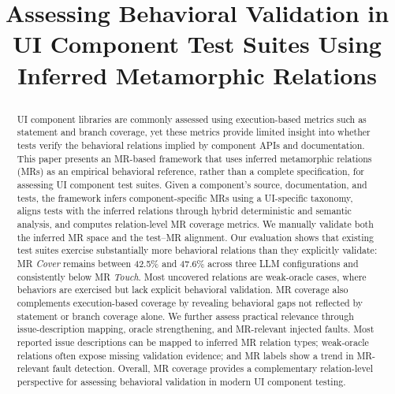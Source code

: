 \documentclass[10pt,conference]{IEEEtran}
\begin{document}
\title{

Assessing Behavioral Validation in UI Component Test Suites Using Inferred Metamorphic Relations
}
\author{
}

\author{


}


\maketitle
\IEEEpeerreviewmaketitle
\begin{abstract}

UI component libraries are commonly assessed using execution-based metrics such as statement and branch coverage, yet these metrics provide limited insight into whether tests verify the behavioral relations implied by component APIs and documentation. 
This paper presents an MR-based framework that uses inferred metamorphic relations (MRs) as an empirical behavioral reference, rather than a complete specification, for assessing UI component test suites. Given a component's source, documentation, and tests, the framework infers component-specific MRs using a UI-specific taxonomy, aligns tests with the inferred relations through hybrid deterministic and semantic analysis, and computes relation-level MR coverage metrics. We manually validate both the inferred MR space and the test--MR alignment.
Our evaluation shows that existing test suites exercise substantially more behavioral relations than they explicitly validate: MR \textit{Cover} remains between 42.5\% and 47.6\% across three LLM configurations and consistently below MR \textit{Touch}. Most uncovered relations are weak-oracle cases, where behaviors are exercised but lack explicit behavioral validation. MR coverage also complements execution-based coverage by revealing behavioral gaps not reflected by statement or branch coverage alone.
We further assess practical relevance through issue-description mapping, oracle strengthening, and MR-relevant injected faults. Most reported issue descriptions can be mapped to inferred MR relation types; weak-oracle relations often expose missing validation evidence; and MR labels show a trend in MR-relevant fault detection. Overall, MR coverage provides a complementary relation-level perspective for assessing behavioral validation in modern UI component testing.

\end{abstract}
\end{document}
